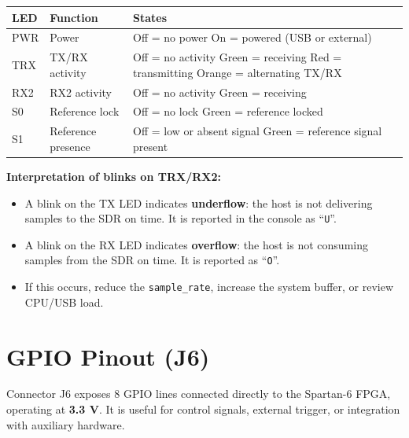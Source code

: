 \documentclass[11pt]{article}
\begin{document}
\begin{table}[h]
    \centering
    \begin{tabular}{p{}p{}p{}}
        \toprule
        \textbf{LED} & \textbf{Function} & \textbf{States} \\
        \midrule
        PWR & Power & Off = no power \quad On = powered (USB or external) \\
        \addlinespace
        TRX & TX/RX activity & Off = no activity \quad Green = receiving \quad Red = transmitting \quad Orange = alternating TX/RX \\
        \addlinespace
        RX2 & RX2 activity & Off = no activity \quad Green = receiving \\
        \addlinespace
        S0 & Reference lock & Off = no lock \quad Green = reference locked \\
        \addlinespace
        S1 & Reference presence & Off = low or absent signal \quad Green = reference signal present \\
        \bottomrule
    \end{tabular}
\end{table}

\textbf{Interpretation of blinks on TRX/RX2:}
\begin{itemize}
    \item A blink on the TX LED indicates \textbf{underflow}: the host is not delivering samples to the SDR on time. It is reported in the console as ``\texttt{U}''.
    \item A blink on the RX LED indicates \textbf{overflow}: the host is not consuming samples from the SDR on time. It is reported as ``\texttt{O}''.
    \item If this occurs, reduce the \texttt{sample\_rate}, increase the system buffer, or review CPU/USB load.
\end{itemize}

\section{GPIO Pinout (J6)}

Connector J6 exposes 8 GPIO lines connected directly to the Spartan-6 FPGA, operating at \textbf{3.3 V}. It is useful for control signals, external trigger, or integration with auxiliary hardware.
\end{document}

